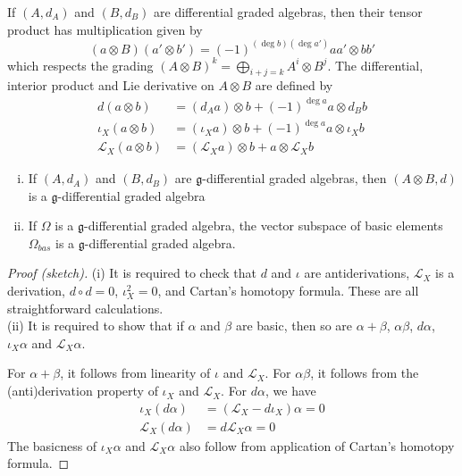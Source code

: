 If $(A,d_A)$ and  $(B,d_B)$ are differential graded algebras, then their tensor product has
multiplication given by 
 \[
	 (a\otimes B)(a'\otimes b') = (-1)^{(\deg b)(\deg a')}aa'\otimes bb'
\] 
which respects the grading $(A\otimes B)^k = \bigoplus_{i+j= k} A^i\otimes B^j$.
The differential, interior product and Lie derivative on $A\otimes B$ are defined by 
\begin{align*}
	d(a\otimes b) &= (d_A a)\otimes b + (-1)^{\deg a}a\otimes d_Bb \\
	\iota_X(a\otimes b) &= (\iota_X a)\otimes b +(-1)^{\deg a}a\otimes \iota_Xb\\
	\mathcal{L}_X(a\otimes b) &= (\mathcal{L}_X a)\otimes b +a\otimes\mathcal{L}_Xb
\end{align*}
 
\begin{prop}  \label{prop:dga_operations}
	\phantom{}	%
	\begin{enumerate}[(i), leftmargin=\parindent]
	    \item 
			If $(A,d_A)$ and  $(B,d_B)$ are $\mathfrak{g}$-differential graded 
			algebras, then $(A\otimes B,d)$ is a $\mathfrak{g}$-differential graded 
			algebra
		\item 
	If $\Omega$ is a  $\mathfrak{g}$-differential graded algebra, the vector
	subspace of basic elements $\Omega_{bas}$ is a $\mathfrak{g}$-differential
	graded algebra.
	\end{enumerate}
\end{prop}
\begin{proof}[Proof (sketch)]
	(i) It is required to check that $d$ and $\iota$ are antiderivations,
	$\mathcal{L}_X$ is a derivation, $d\circ d = 0$,  $\iota_X^2=0$, and
	Cartan's homotopy formula. These are all straightforward calculations.\\
	(ii) It is required to show that if $\alpha$ and  $\beta$ are basic, then so
	are $\alpha+\beta$,  $\alpha\beta$,  $d\alpha$,  $\iota_X \alpha$ and
	$\mathcal{L}_X\alpha $. 

	For $\alpha+\beta$, it follows from linearity of  $\iota$ and
	$\mathcal{L}_X$. For $\alpha\beta$, it follows from the (anti)derivation
	property of $\iota_X$ and  $\mathcal{L}_X$. For $d\alpha$, we have 
	 \begin{align*}
		 \iota_X(d\alpha) &= (\mathcal{L}_X-d\iota_X)\alpha = 0 \tag{by Cartan's
		 homotopy formula} \\
			 \mathcal{L}_X(d\alpha) &= d\mathcal{L}_X \alpha = 0 
		\tag{again by Cartan's homotopy formula}
	 \end{align*} 
	The basicness of $\iota_X\alpha$ and  $\mathcal{L}_X\alpha$ also follow 
	from application of Cartan's homotopy formula.
\end{proof}

